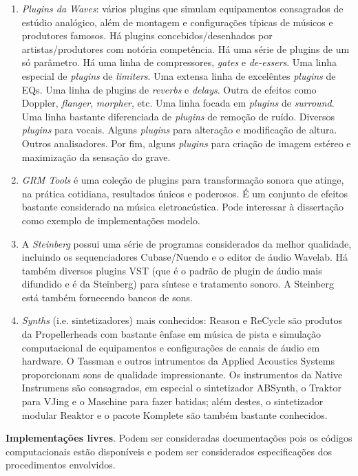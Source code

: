\begin{enumerate}
    \item \emph{Plugins da Waves}: vários plugins que simulam equipamentos consagrados de estúdio analógico, além de montagem e configurações típicas de músicos e produtores famosos. Há plugins concebidos/desenhados por artistas/produtores com notória competência. Há uma série de plugins de um só parâmetro. Há uma linha de compressores, \emph{gates} e \emph{de-essers}. Uma linha especial de \emph{plugins} de \emph{limiters}. Uma extensa linha de excelêntes \emph{plugins} de EQs. Uma linha de plugins de \emph{reverbs} e \emph{delays}. Outra de efeitos como Doppler, \emph{flanger}, \emph{morpher}, etc. Uma linha focada em \emph{plugins} de \emph{surround}. Uma linha bastante diferenciada de \emph{plugins} de remoção de ruído. Diversos \emph{plugins} para vocais. Alguns \emph{plugins} para alteração e modificação de altura. Outros analisadores. Por fim, alguns \emph{plugins} para criação de imagem estéreo e maximização da sensação do grave.
    \item \emph{GRM Tools} é uma coleção de plugins para transformação sonora que atinge, na prática cotidiana, resultados únicos e poderosos. É um conjunto de efeitos bastante considerado na música eletroacústica. Pode interessar à dissertação como exemplo de implementações modelo. 
    \item A \emph{Steinberg} possui uma série de programas considerados da melhor qualidade, incluindo os sequenciadores Cubase/Nuendo e o editor de áudio Wavelab. Há também diversos plugins VST (que é o padrão de plugin de áudio mais difundido e é da Steinberg) para síntese e tratamento sonoro. A Steinberg está também fornecendo bancos de sons. 
    \item \emph{Synths} (i.e. sintetizadores) mais conhecidos: Reason e ReCycle são produtos da Propellerheads com bastante ênfase em música de pista e simulação computacional de equipamentos e configurações de canais de áudio em hardware. O Tassman e outros intrumentos da Applied Acoustics Systems proporcionam sons de qualidade impressionante. Os instrumentos da Native Instrumens são consagrados, em especial o sintetizador ABSynth, o Traktor para VJing e o Maschine para fazer batidas; além destes, o sintetizador modular Reaktor e o pacote Komplete são também bastante conhecidos. 
\end{enumerate}

{\bf Implementações livres}. Podem ser consideradas documentações pois os códigos computacionais estão disponíveis e podem ser considerados especificações dos procedimentos envolvidos. 

